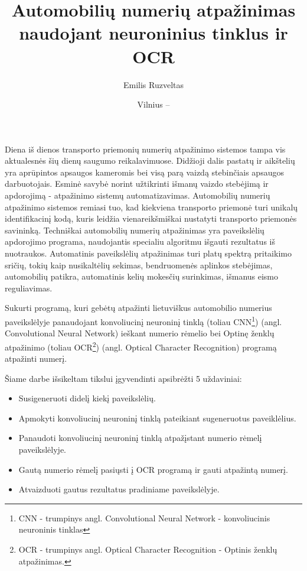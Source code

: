 \documentclass{VUMIFPSkursinis}
\title{Automobilių numerių atpažinimas naudojant neuroninius tinklus ir OCR}
\author{Emilis Ruzveltas}
\date{Vilnius – \the\year}
\begin{document}
\maketitle

\tableofcontents

Diena iš dienos transporto priemonių numerių atpažinimo sistemos tampa vis aktualesnės šių dienų 
saugumo reikalavimuose. Didžioji dalis pastatų ir aikštelių yra aprūpintos apsaugos kameromis bei
visą parą vaizdą stebinčiais apsaugos darbuotojais. Esminė savybė norint užtikrinti išmanų vaizdo
stebėjimą ir apdorojimą - atpažinimo sistemų automatizavimas. Automobilių numerių atpažinimo sistemos
remiasi tuo, kad kiekviena transporto priemonė turi unikalų identifikacinį kodą, kuris leidžia
vienareikšmiškai nustatyti transporto priemonės savininką. Techniškai automobilių numerių atpažinimas
yra paveikslėlių apdorojimo programa, naudojantis specialiu algoritmu išgauti rezultatus iš nuotraukos.
Automatinis paveikslėlių atpažinimas turi platų spektrą pritaikimo sričių, tokių kaip nusikaltėlių sekimas,
bendruomenės aplinkos stebėjimas, automobilių patikra, automatinis kelių mokesčių surinkimas, išmanus eismo
reguliavimas.
\cite{bhushan2013license}

Sukurti programą, kuri gebėtų atpažinti lietuviškus automobilio numerius paveikslėlyje panaudojant
konvoliucinį neuroninį tinklą 
(toliau CNN\footnote{CNN - trumpinys angl. Convolutional Neural Network - konvoliucinis neuroninis tinklas}) (angl. Convolutional Neural Network)
ieškant numerio rėmelio bei Optinę ženklų atpažinimo 
(toliau OCR\footnote{OCR - trumpinys angl. Optical Character Recognition - Optinis ženklų atpažinimas.}) (angl. Optical Character Recognition) 
programą atpažinti numerį.

Šiame darbe išsikeltam tikslui įgyvendinti apsibrėžti 5 uždaviniai:

\begin{itemize}
  \item Susigeneruoti didelį kiekį paveikslėlių.
  \item Apmokyti konvoliucinį neuroninį tinklą pateikiant sugeneruotus paveiklėlius.
  \item Panaudoti konvoliucinį neuroninį tinklą atpažįstant numerio rėmelį paveikslėlyje.
  \item Gautą numerio rėmelį pasiųsti į OCR programą ir gauti atpažintą numerį.
  \item Atvaizduoti gautus rezultatus pradiniame paveikslėlyje.
\end{itemize}
\end{document}
